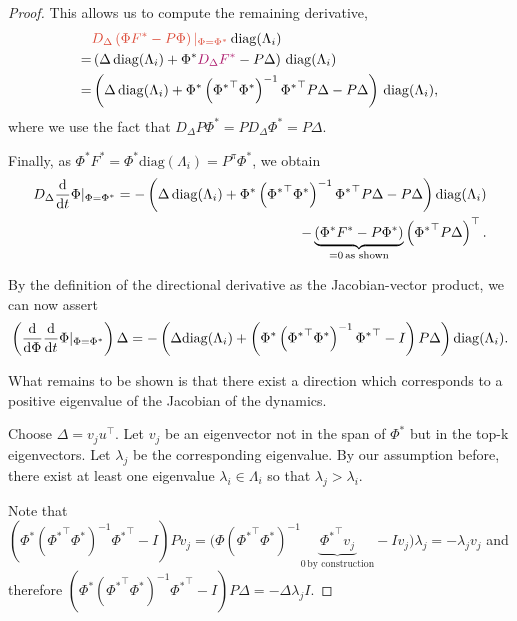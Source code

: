 \begin{proof}
This allows us to compute the remaining derivative,
\begin{align}
    &{\color{uoftred}D_\Delta \left(\Phi F^* - P \Phi\right)|_{\Phi=\Phi^*}}\, \mathrm{diag}(\Lambda_i)\\
    = & \left(\Delta\, \mathrm{diag}(\Lambda_i) + \Phi^*{\color{uoftmagenta} D_\Delta F^*}  - P\Delta \right)\,\mathrm{diag}(\Lambda_i)\\
    = & \left(\Delta\, \mathrm{diag}(\Lambda_i) + \Phi^*\left({\Phi^*}^\top {\Phi^*}\right)^{-1}{\Phi^*}^\top P \Delta  - P\Delta \right)\,\mathrm{diag}(\Lambda_i),
\end{align}
where we use the fact that $D_\Delta P\Phi^* = P D_\Delta \Phi^* = P \Delta$.

Finally, as $\Phi^*F^* = \Phi^* \mathrm{diag}(\Lambda_i) = P^\pi \Phi^*$, we obtain
\begin{align}
 D_\Delta \frac{\mathrm{d}}{\mathrm{d} t} \Phi |_{\Phi=\Phi^*} =   -\left(\Delta\, \mathrm{diag}(\Lambda_i) + {\Phi^*}\left({\Phi^*}^\top \Phi^*\right)^{-1}{\Phi^*}^\top P \Delta  - P\Delta \right)\mathrm{diag}(\Lambda_i) \\- \underbrace{\left(\Phi^* F^* - P \Phi^*\right)}_{=0\,\text{as shown}}\left({\Phi^*}^\top P \Delta\right)^\top.
\end{align}


By the definition of the directional derivative as the Jacobian-vector product, we can now assert
\begin{align}
    \left(\frac{\mathrm{d}}{\mathrm{d} \Phi} \frac{\mathrm{d}}{\mathrm{d} t}\Phi |_{\Phi=\Phi^*}\right) \Delta = - \left(\Delta \mathrm{diag}(\Lambda_i) + \left(\Phi^*\left({\Phi^*}^\top {\Phi^*}\right)^{-1}{\Phi^*}^\top - I\right) P \Delta\right)\mathrm{diag}(\Lambda_i).
\end{align}

What remains to be shown is that there exist a direction which corresponds to a positive eigenvalue of the Jacobian of the dynamics.

Choose $\Delta = v_j u^\top$. Let $v_j$ be an eigenvector not in the span of $\Phi^*$ but in the top-k eigenvectors. Let  $\lambda_j$ be the corresponding eigenvalue. By our assumption before, there exist at least one eigenvalue $\lambda_i \in \Lambda_i$ so that $\lambda_j > \lambda_i$.

Note that $\left(\Phi^*\left({\Phi^*}^\top {\Phi^*}\right)^{-1}{\Phi^*}^\top - I\right) P v_j = \Big(\Phi\left({\Phi^*}^\top {\Phi^*}\right)^{-1}\underbrace{{\Phi^*}^\top v_j}_{0\, \text{by construction}} - I v_j\Big) \lambda_j = -\lambda_j v_j$ and therefore $\left(\Phi^*\left({\Phi^*}^\top \Phi^*\right)^{-1}{\Phi^*}^\top - I\right) P \Delta = -\Delta \lambda_j I.$


\end{proof}
